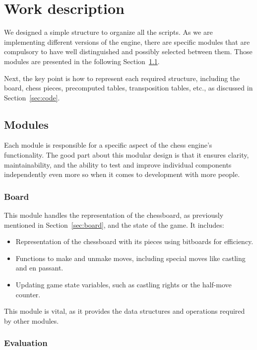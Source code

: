 \chapter{Work description}
\label{cap:descripcionTrabajo}

We designed a simple structure to organize all the scripts. As we are implementing different versions of the engine, there are specific modules that are compulsory to have well distinguished and possibly selected between them. Those modules are presented in the following Section~\ref{sec:modules}.

\vspace{1em}

\noindent Next, the key point is how to represent each required structure, including the board, chess pieces, precomputed tables, transposition tables, etc., as discussed in Section~\ref{sec:code}.

\section{Modules}
\label{sec:modules}

Each module is responsible for a specific aspect of the chess engine's functionality. The good part about this modular design is that it ensures clarity, maintainability, and the ability to test and improve individual components independently even more so when it comes to development with more people.

\subsection{Board}

\noindent This module handles the representation of the chessboard, as previously mentioned in Section~\ref{sec:board}, and the state of the game. It includes:
\begin{itemize}
    \item Representation of the chessboard with its pieces using bitboards for efficiency.
    \item Functions to make and unmake moves, including special moves like castling and en passant.
    \item Updating game state variables, such as castling rights or the half-move counter.
\end{itemize}

\noindent This module is vital, as it provides the data structures and operations required by other modules.

\subsection{Evaluation}


